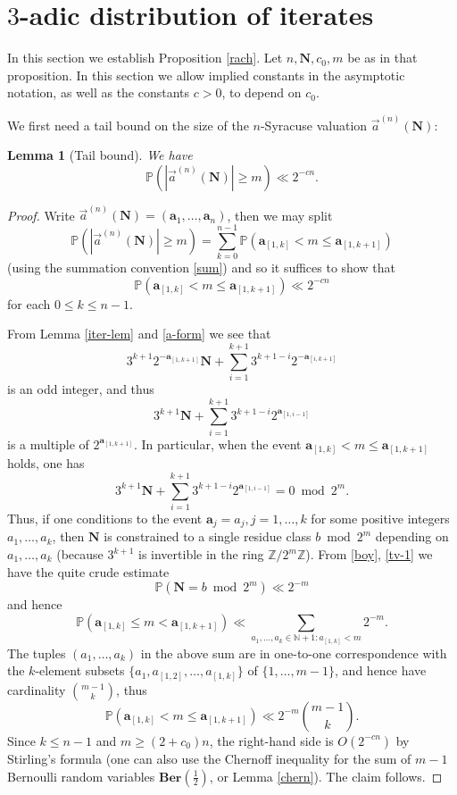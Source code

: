 \documentclass[12pt,a4paper,reqno]{amsart}
\numberwithin{equation}{section}
\theoremstyle{plain}
\newtheorem{lemma}[theorem]{Lemma}
\theoremstyle{definition}
\renewcommand\P{\mathbb{P}}
\newcommand\Z{\mathbb{Z}}
\newcommand\N{\mathbb{N}}
\renewcommand\a{\mathbf{a}}
\renewcommand{\mod}{\bmod}
\begin{document}
\section{$3$-adic distribution of iterates}\label{rach-sec}

In this section we establish Proposition \ref{rach}.  Let $n, \mathbf{N}, c_0, m$ be as in that proposition. In this section we allow implied constants in the asymptotic notation, as well as the constants $c>0$, to depend on $c_0$. 

We first need a tail bound on the size of the $n$-Syracuse valuation $\vec a^{(n)}(\mathbf{N})$:

\begin{lemma}[Tail bound]\label{tail}  We have
$$ \P( |\vec a^{(n)}(\mathbf{N})| \geq m ) \ll 2^{-cn}.$$
\end{lemma}

\begin{proof}  Write $\vec a^{(n)}(\mathbf{N}) = (\a_1,\dots,\a_n)$, then we may split
$$ \P( |\vec a^{(n)}(\mathbf{N})| \geq m ) = \sum_{k=0}^{n-1}  \P( \a_{[1,k]} < m \leq \a_{[1,k+1]} )$$
(using the summation convention \eqref{sum})
and so it suffices to show that
$$ \P( \a_{[1,k]} < m \leq \a_{[1,k+1]} ) \ll 2^{-cn}$$
for each $0 \leq k \leq n-1$.

From Lemma \ref{iter-lem} and \eqref{a-form} we see that
$$ 3^{k+1} 2^{- \a_{[1,k+1]}} \mathbf{N} + \sum_{i=1}^{k+1} 3^{k+1-i} 2^{-\a_{[i,k+1]}} $$
is an odd integer, and thus
$$ 3^{k+1} \mathbf{N} + \sum_{i=1}^{k+1} 3^{k+1-i} 2^{\a_{[1,i-1]}}$$
is a multiple of $2^{\a_{[1,k+1]}}$.  In particular, when the event $\a_{[1,k]} < m \leq \a_{[1,k+1]}$ holds, one has
$$ 3^{k+1} \mathbf{N} + \sum_{i=1}^{k+1} 3^{k+1-i} 2^{\a_{[1,i-1]}} = 0 \mod 2^m.$$
Thus, if one conditions to the event $\a_j = a_j, j=1,\dots,k$ for some positive integers $a_1,\dots,a_k$, then $\mathbf{N}$ is constrained to a single residue class $b \mod 2^m$ depending on $a_1,\dots,a_k$ (because $3^{k+1}$ is invertible in the ring $\Z/2^m\Z$).  From \eqref{boy}, \eqref{tv-1} we have the quite crude estimate
$$ \P( \mathbf{N} = b \mod 2^m ) \ll 2^{-m}$$
and hence
$$ \P( \a_{[1,k]} \leq m < \a_{[1,k+1]} ) \ll \sum_{a_1,\dots,a_k \in \N+1: a_{[1,k]} < m} 2^{-m}.$$
The tuples $(a_1,\dots,a_k)$ in the above sum are in one-to-one correspondence with the $k$-element subsets $\{ a_1, a_{[1,2]},\dots,a_{[1,k]}\}$ of $\{1,\dots,m-1\}$, and hence have cardinality $\binom{m-1}{k}$, thus
$$ \P( \a_{[1,k]} < m \leq \a_{[1,k+1]} ) \ll 2^{-m} \binom{m-1}{k}.$$
Since $k \leq n-1$ and $m \geq (2+c_0) n$, the right-hand side is $O(2^{-cn})$ by Stirling's formula (one can also use the Chernoff inequality for the sum of $m-1$ Bernoulli random variables $\mathbf{Ber}(\frac{1}{2})$, or Lemma \ref{chern}).  The claim follows.
\end{proof}
\end{document}
